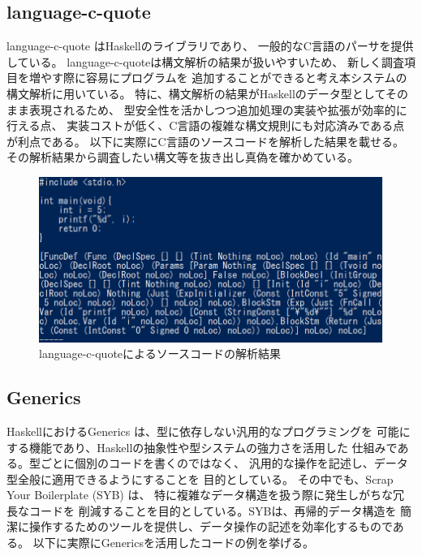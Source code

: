 \documentclass{cssspaper}
\begin{document}

            \subsection{language-c-quote}
            language-c-quote \cite{7}はHaskellのライブラリであり、
            一般的なC言語のパーサを提供している。
            language-c-quoteは構文解析の結果が扱いやすいため、
            新しく調査項目を増やす際に容易にプログラムを
            追加することができると考え本システムの構文解析に用いている。
            特に、構文解析の結果がHaskellのデータ型としてそのまま表現されるため、
            型安全性を活かしつつ追加処理の実装や拡張が効率的に行える点、
            実装コストが低く、C言語の複雑な構文規則にも対応済みである点が利点である。
            以下に実際にC言語のソースコードを解析した結果を載せる。
            その解析結果から調査したい構文等を抜き出し真偽を確かめている。
            \begin{figure}[h]
                \centering
                \includegraphics[width=15cm]{lcq.png}
                \caption{language-c-quoteによるソースコードの解析結果}
                \label{fig:lcq}
            \end{figure}

            \subsection{Generics}
            HaskellにおけるGenerics \cite{8}は、型に依存しない汎用的なプログラミングを
            可能にする機能であり、Haskellの抽象性や型システムの強力さを活用した
            仕組みである。型ごとに個別のコードを書くのではなく、
            汎用的な操作を記述し、データ型全般に適用できるようにすることを
            目的としている。
            その中でも、Scrap Your Boilerplate (SYB) \cite{9}は、
            特に複雑なデータ構造を扱う際に発生しがちな冗長なコードを
            削減することを目的としている。SYBは、再帰的データ構造を
            簡潔に操作するためのツールを提供し、データ操作の記述を効率化するものである。
            以下に実際にGenericsを活用したコードの例を挙げる。
\end{document}
